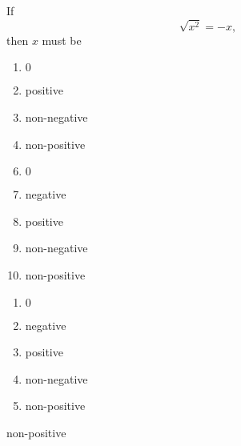 



  If \[\sqrt{x^{2}}=-x,\] then $x$ must be 


\ifsat
	\begin{enumerate}[label=\Alph*)]
		\item    $0$
		\item positive 
		\item  non-negative 
		\item  non-positive %
	\end{enumerate}
\else
\fi

\ifacteven
	\begin{enumerate}[label=\textbf{\Alph*.},itemsep=\fill,align=left]
		\setcounter{enumii}{5}
		\item    $0$
		\item  negative 
		\item positive 
		\addtocounter{enumii}{1}
		\item  non-negative 
		\item  non-positive %
	\end{enumerate}
\else
\fi

\ifactodd
	\begin{enumerate}[label=\textbf{\Alph*.},itemsep=\fill,align=left]
		\item    $0$
		\item  negative 
		\item positive 
		\item  non-negative 
		\item  non-positive %
	\end{enumerate}
\else
\fi

\ifgridin
  non-positive %

\else
\fi

